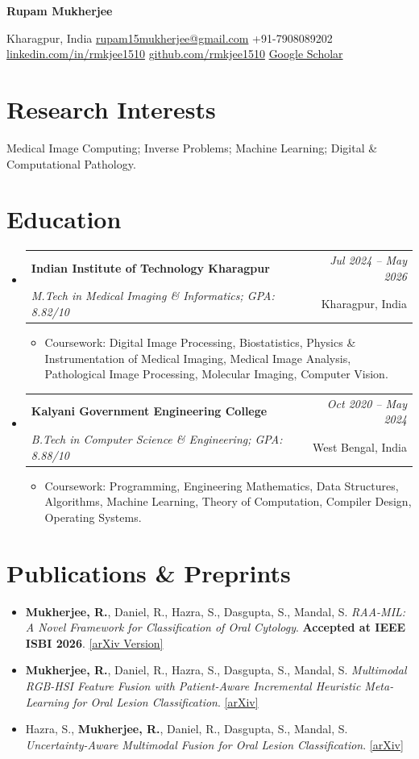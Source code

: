 \documentclass[a4paper,11pt]{article}
\makeatletter
\newcommand{\resumeSubheading}[4]{
\item
    \begin{tabular*}{0.98\textwidth}[t]{l@{\extracolsep{\fill}}r}
        \textbf{#1} & \textit{\footnotesize{#4}} \\
        \textit{\footnotesize{#3}} &  \footnotesize{#2}\\
    \end{tabular*}
}
\newcommand{\resumeItem}[1]{\item #1}
\newcommand{\resumeListStart}{\begin{itemize}[leftmargin=*]}
\newcommand{\resumeListEnd}{\end{itemize}\vspace{-1mm}}
\newcommand{\iconMap}{\faMapMarker*}
\newcommand{\iconMail}{\faEnvelope}
\newcommand{\iconPhone}{\faPhone}
\newcommand{\iconLinkedin}{\faLinkedin}
\newcommand{\iconGithub}{\faGithub}
\newcommand{\iconScholar}{\faGraduationCap}
\newcommand{\Name}{Rupam Mukherjee}
\newcommand{\Header}{
\begin{center}
  {\fontsize{20}{22}\bfseries \Name}\par
  \vspace{4pt}\small
  \iconMap\; Kharagpur, India \quad
  \iconMail\; \href{mailto:rupam15mukherjee@gmail.com}{rupam15mukherjee@gmail.com} \quad
  \iconPhone\; +91-7908089202 \\[3pt]
  \iconLinkedin\; \href{https://www.linkedin.com/in/rmkjee1510/}{linkedin.com/in/rmkjee1510} \quad
  \iconGithub\; \href{https://github.com/rmkjee1510}{github.com/rmkjee1510} \quad
  \iconScholar\; \href{https://scholar.google.co.in/citations?user=vGCmebAAAAAJ}{Google Scholar}
\end{center}
\vspace{-0.5em}
}
\makeatother
\begin{document}
\Header

\section*{Research Interests}
Medical Image Computing; Inverse Problems; Machine Learning; Digital \& Computational Pathology.

\section*{Education}
\begin{itemize}[leftmargin=*]
  \resumeSubheading
    {Indian Institute of Technology Kharagpur}{Kharagpur, India}
    {M.Tech in Medical Imaging \& Informatics; GPA: 8.82/10}{Jul 2024 -- May 2026}
    \resumeListStart
      \resumeItem{Coursework: Digital Image Processing, Biostatistics, Physics \& Instrumentation of Medical Imaging, Medical Image Analysis, Pathological Image Processing, Molecular Imaging, Computer Vision.}
    \resumeListEnd

  \resumeSubheading
    {Kalyani Government Engineering College}{West Bengal, India}
    {B.Tech in Computer Science \& Engineering; GPA: 8.88/10}{Oct 2020 -- May 2024}
    \resumeListStart
      \resumeItem{Coursework: Programming, Engineering Mathematics, Data Structures, Algorithms, Machine Learning, Theory of Computation, Compiler Design, Operating Systems.}
    \resumeListEnd
\end{itemize}

\section*{Publications \& Preprints}
\begin{itemize}[leftmargin=*]

\item \textbf{Mukherjee, R.}, Daniel, R., Hazra, S., Dasgupta, S., Mandal, S.
\textit{RAA-MIL: A Novel Framework for Classification of Oral Cytology}.   \textbf{Accepted at IEEE ISBI 2026}.
\href{https://arxiv.org/abs/2511.12269}{[arXiv Version]} \quad

\item \textbf{Mukherjee, R.}, Daniel, R., Hazra, S., Dasgupta, S., Mandal, S.
\textit{Multimodal RGB-HSI Feature Fusion with Patient-Aware Incremental Heuristic Meta-Learning for Oral Lesion Classification}.
\href{https://arxiv.org/abs/2511.12268}{[arXiv]} \quad

\item  Hazra, S., \textbf{Mukherjee, R.}, Daniel, R., Dasgupta, S., Mandal, S.
\textit{Uncertainty-Aware Multimodal Fusion for Oral Lesion Classification}.
\href{https://arxiv.org/abs/2511.12268}{[arXiv]} \quad

\end{itemize}
\end{document}
